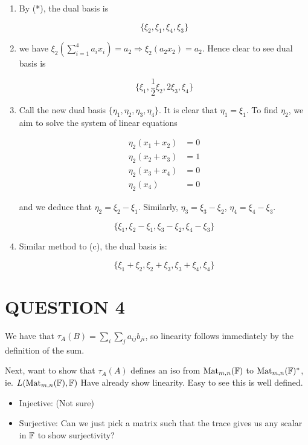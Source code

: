 \documentclass[a4paper]{article}
\begin{document}
\begin{enumerate}[label=(\alph*)]
	\item By (*), the dual basis is
	
	\[ \{  \xi_{2}, \xi_{1},\xi_{4},\xi_{3} \} \]
	
	\item we have $ \xi_{2}  \left(  \sum_{i=1}^{4} a_{i}x_{i} \right)  = a_{2} \Rightarrow \xi_{2} (  a_{2}x_{2} ) = a_{2} $. Hence clear to see dual basis is  
	
	\[ \{  \xi_{1}, \frac{1}{2} \xi_{2}, 2 \xi_{3},\xi_{4} \} \]
	
	\item Call the new dual basis $ \{  \eta_{1},\eta_{2},\eta_{3},\eta_{4} \} $. It is clear that $ \eta_{1} = \xi_{1} $. To find $ \eta_{2} $, we aim to solve the system of linear equations
	
	
\begin{align*}
\eta_{2}(x_{1} +x_{2})  & = 0  \\
\eta_{2}(x_{2}+x_{3}) & = 1 \\
\eta_{2}(x_{3} + x_{4}) & = 0 \\
\eta_{2} (x_{4}) & = 0
\end{align*} 


and we deduce that $ \eta_{2} = \xi_{2} - \xi_{1} $. Similarly, $ \eta_{3} = \xi_{3} - \xi_{2} $, $ \eta_{4} = \xi_{4} - \xi_{3} $.

\[ \{  \xi_{1}, \xi_{2} - \xi_{1}, \xi_{3} - \xi_{2}, \xi_{4} - \xi_{3}  \} \]

\item Similar method to (c), the dual basis is:

\[ \{  \xi_{1} + \xi_{2}, \xi_{2} + \xi_{3}, \xi_{3} + \xi_{4}, \xi_{4}  \} \]

\end{enumerate}





\section{QUESTION 4}

We have that $ \tau_{A}(B) = \sum_{i} \sum_{j} a_{ij} b_{ji}    $, so linearity follows immediately by the definition of the sum. 

Next, want to show that $ \tau_{A}(A) $ defines an iso from $ \text{Mat}_{m,n}(\mathbb{F}) $ to $ \text{Mat}_{m,n}(\mathbb{F})^{*} $, ie. $ L ( \text{Mat}_{m,n}(\mathbb{F}), \mathbb{F}  ) $ Have already show linearity. Easy to see this is well defined. 
\begin{itemize}
	\item Injective: (Not sure)
	
	\item Surjective: Can we just pick a matrix such that the trace gives us any scalar in $ \mathbb{F} $ to show surjectivity?
\end{itemize}
\end{document}
